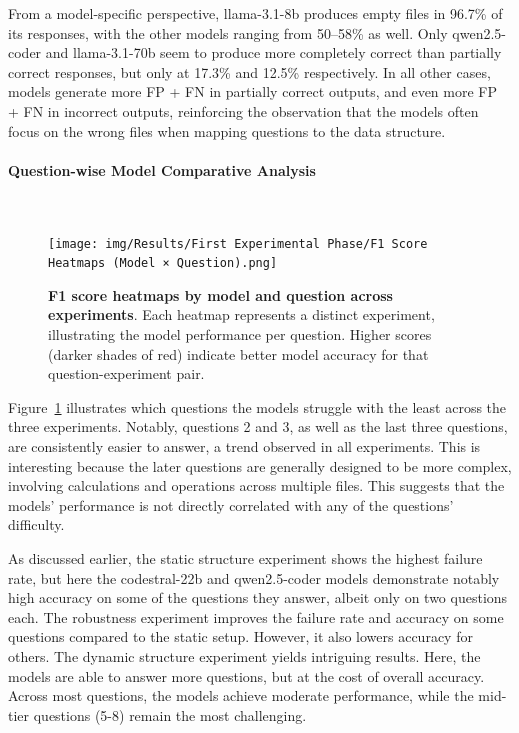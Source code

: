 \documentclass{DESSThesis}
\begin{document}
From a model-specific perspective, llama-3.1-8b produces empty files in 96.7\% of its responses, with the other models ranging from 50–58\% as well. Only qwen2.5-coder and llama-3.1-70b seem to produce more completely correct than partially correct responses, but only at 17.3\% and 12.5\% respectively. In all other cases, models generate more FP + FN in partially correct outputs, and even more FP + FN in incorrect outputs, reinforcing the observation that the models often focus on the wrong files when mapping questions to the data structure.

\paragraph{Question-wise Model Comparative Analysis}\mbox{}\\

\begin{figure}[!b]
    \centering
    \texttt{[image: img/Results/First Experimental Phase/F1 Score Heatmaps (Model × Question).png]}
    \caption[F1 score heatmaps by model and question across experiments]{\textbf{F1 score heatmaps by model and question across experiments}. Each heatmap represents a distinct experiment, illustrating the model performance per question. Higher scores (darker shades of red) indicate better model accuracy for that question-experiment pair.}
    \label{fig:f1_score_heatmap}
\end{figure}

\noindent Figure~\ref{fig:f1_score_heatmap} illustrates which questions the models struggle with the least across the three experiments. Notably, questions 2 and 3, as well as the last three questions, are consistently easier to answer, a trend observed in all experiments. This is interesting because the later questions are generally designed to be more complex, involving calculations and operations across multiple files. This suggests that the models' performance is not directly correlated with any of the questions' difficulty.

As discussed earlier, the static structure experiment shows the highest failure rate, but here the codestral-22b and qwen2.5-coder models demonstrate notably high accuracy on some of the questions they answer, albeit only on two questions each. The robustness experiment improves the failure rate and accuracy on some questions compared to the static setup. However, it also lowers accuracy for others. The dynamic structure experiment yields intriguing results. Here, the models are able to answer more questions, but at the cost of overall accuracy. Across most questions, the models achieve moderate performance, while the mid-tier questions (5-8) remain the most challenging.
\end{document}
